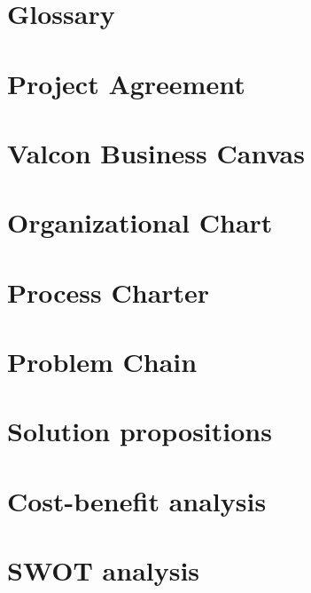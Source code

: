 \chapter{Glossary}

\chapter{Project Agreement}

\chapter{Valcon Business Canvas}

\chapter{Organizational Chart}

\chapter{Process Charter}

\chapter{Problem Chain}

\chapter{Solution propositions}

\chapter{Cost-benefit analysis}

\chapter{SWOT analysis}
